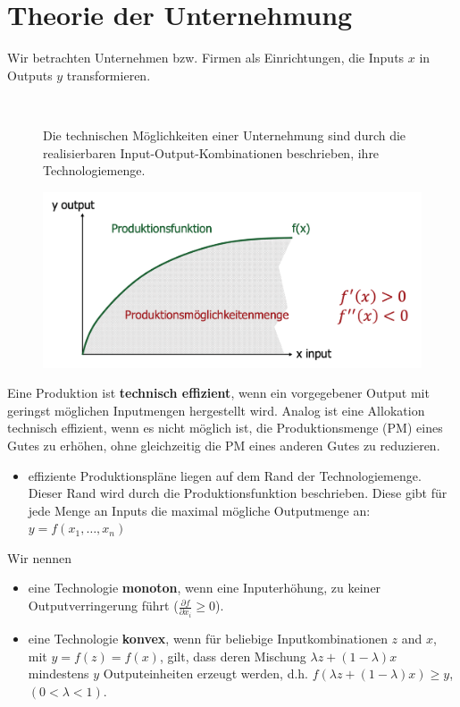 \chapter{Theorie der Unternehmung}
Wir betrachten Unternehmen bzw. Firmen als Einrichtungen, die Inputs $x$ in Outputs $y$ transformieren.
\begin{figure}[htbp!]
	\begin{minipage}[t]{8cm} \vspace{0pt} ~\medskip
	
		 Die technischen Möglichkeiten einer Unternehmung sind durch die realisierbaren Input-Output-Kombinationen beschrieben, ihre Technologiemenge.
	\end{minipage}
	\hspace{0.25cm}
	\begin{minipage}[t]{4cm}\vspace{0.01pt}
		\includegraphics[scale=0.225]{img/technologiemenge}
	\end{minipage}
\end{figure} 

Eine Produktion ist \textbf{technisch effizient}, wenn ein vorgegebener Output mit geringst möglichen Inputmengen hergestellt wird. Analog ist eine Allokation technisch effizient, wenn es nicht möglich ist, die Produktionsmenge (PM) eines Gutes zu erhöhen, ohne gleichzeitig die PM eines anderen Gutes zu reduzieren.

\begin{itemize}
	\item effiziente Produktionspläne liegen auf dem Rand der Technologiemenge. Dieser Rand wird durch die Produktionsfunktion beschrieben. Diese gibt für jede Menge an Inputs die maximal mögliche Outputmenge an: $y = f(x_1, \dotsc, x_n)$
\end{itemize}

Wir nennen
\begin{itemize}
	\item eine Technologie \textbf{monoton}, wenn eine Inputerhöhung, zu keiner Outputverringerung führt ($\frac{\partial f}{\partial x_i} \geq 0$).
	\item eine Technologie \textbf{konvex}, wenn für beliebige Inputkombinationen $z$ and $x$, mit $y = f(z) = f(x)$, gilt, dass deren Mischung $\lambda z + (1-\lambda) x$ mindestens $y$ Outputeinheiten erzeugt werden, d.h. $f(\lambda z + (1-\lambda)x) \geq y$, $(0 < \lambda < 1)$.
\end{itemize}

